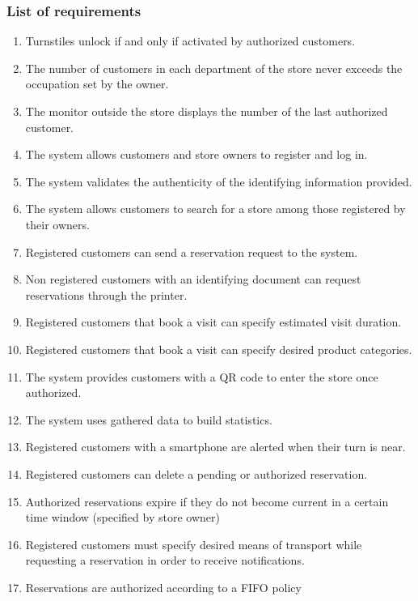 \subsubsection{List of requirements}
\begin{enumerate}[label=R\arabic*]
	\item Turnstiles unlock if and only if activated by authorized customers.
	\item The number of customers in each department of the store never exceeds the occupation set by the owner.
	\item The monitor outside the store displays the number of the last authorized customer.
	\item The system allows customers and store owners to register and log in.
	\item The system validates the authenticity of the identifying information provided.
	\item The system allows customers to search for a store among those registered by their owners.
	\item Registered customers can send a reservation request to the system.
	\item Non registered customers with an identifying document can request reservations through the printer.
	\item Registered customers that book a visit can specify estimated visit duration.
	\item Registered customers that book a visit can specify desired product categories.
	\item The system provides customers with a QR code to enter the store once authorized.
	\item The system uses gathered data to build statistics.
	\item Registered customers with a smartphone are alerted when their turn is near.

	\item Registered customers can delete a pending or authorized reservation.
	\item Authorized reservations expire if they do not become current in a certain time window (specified by store owner)
	\item Registered customers must specify desired means of transport while requesting a reservation in order to receive notifications.
	\item Reservations are authorized according to a FIFO policy
\end{enumerate}
